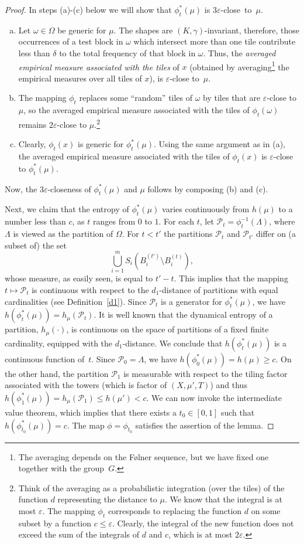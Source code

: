 \documentclass{amsart}
\theoremstyle{remark}
\def \P {\mathcal P}
\def \eps {\varepsilon}
\def \sq {sequence}
\def \inv {invariant}
\begin{document}
\begin{proof}
In steps (a)-(c) below we will show that $\phi_t^*(\mu)$ is $3\eps$-close~to~$\mu$.
\begin{enumerate}[(a)]
    \item Let $\omega\in\Omega$ be generic for $\mu$. The shapes are $(K,\gamma)$-\inv, therefore, those occurrences of a test block in $\omega$ which intersect more than one tile contribute less than $\delta$ to the total frequency of that block in $\omega$. Thus, the \emph{averaged empirical measure associated with the tiles} of $x$ (obtained by averaging\footnote{The averaging depends on the F\o lner \sq, but we have fixed one together with the group~$G$.} the empirical measures over all tiles of $x$), is $\eps$-close to~$\mu$.
    \item The mapping $\phi_t$ replaces some ``random'' tiles of $\omega$ by tiles that are $\eps$-close to $\mu$, so the averaged empirical measure associated with the tiles of $\phi_t(\omega)$ remains $2\eps$-close to $\mu$.\footnote{Think of the averaging as a probabilistic integration (over the tiles) of the function $d$ representing the distance to $\mu$. We know that the integral is at most $\eps$. The mapping $\phi_t$ corresponds to replacing the function $d$ on some subset by a function $c\le\eps$. Clearly, the integral of the new function does not exceed the sum of the integrals of $d$ and $c$, which is at most $2\eps$.}
    \item Clearly, $\phi_t(x)$ is generic for $\phi^*_t(\mu)$. Using the same argument as in (a), the averaged empirical measure associated with the tiles of $\phi_t(x)$ is $\eps$-close to $\phi_t^*(\mu)$.  
\end{enumerate}
Now, the $3\eps$-closeness of $\phi_t^*(\mu)$ and $\mu$ follows by composing (b) and (c).

Next, we claim that the entropy of $\phi_t^*(\mu)$ varies continuously from $h(\mu)$ to a number less than $c$, as $t$ ranges from $0$ to $1$. For each $t$, let $\P_t=\phi_t^{-1}(\Lambda)$, where $\Lambda$ is viewed as the partition of $\Omega$. For $t<t'$ the partitions $\P_t$ and $\P_{t'}$ differ on (a subset of) the set
$$
\bigcup_{i=1}^mS_i(B_i^{(t')}\setminus B_i^{(t)}),
$$
whose measure, as easily seen, is equal to $t'-t$. This implies that the mapping $t\mapsto\P_t$ is continuous with respect to the $d_1$-distance of partitions with equal cardinalities (see Definition~\ref{d1}). 
Since $\P_t$ is a generator for $\phi_t^*(\mu)$, we have $h(\phi_t^*(\mu))=h_\mu(\P_t)$. It is well known that the dynamical entropy of a partition, $h_\mu(\cdot)$, is continuous on the space of partitions of a fixed finite cardinality, equipped with the $d_1$-distance. We conclude that $h(\phi_t^*(\mu))$ is a continuous function of~$t$. Since $\P_0=\Lambda$, we have $h(\phi_0^*(\mu))=h(\mu)\ge c$. On the other hand, the partition $\P_1$ is measurable with respect to the tiling factor associated with the towers (which is factor of $(X,\mu',T)$) and thus $h(\phi_1^*(\mu))=h_\mu(\P_1)\le h(\mu')<c$. We can now invoke the intermediate value theorem, which implies that there exists a $t_0\in[0,1]$ such that $h(\phi_{t_0}^*(\mu))=c$. The map $\phi=\phi_{t_0}$ satisfies the assertion of the lemma.
\end{proof}
\end{document}
